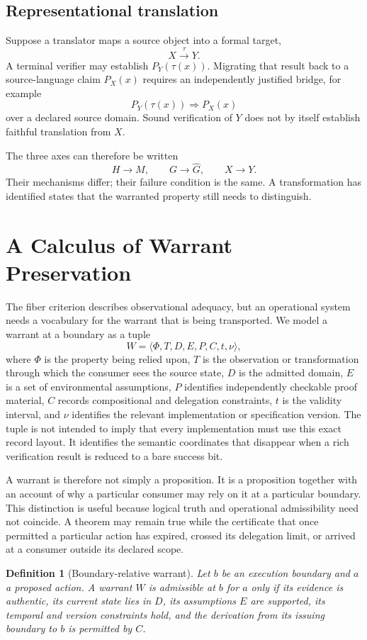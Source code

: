 \documentclass[11pt]{article}
\newtheorem{definition}{Definition}
\begin{document}
\subsection{Representational translation}
Suppose a translator maps a source object into a formal target,
\[
X\xrightarrow{\tau}Y.
\]
A terminal verifier may establish $P_Y(\tau(x))$. Migrating that result back to a source-language claim $P_X(x)$ requires an independently justified bridge, for example
\[
P_Y(\tau(x))\Longrightarrow P_X(x)
\]
over a declared source domain. Sound verification of $Y$ does not by itself establish faithful translation from $X$.

The three axes can therefore be written
\[
H\to M,\qquad G\to\widehat G,\qquad X\to Y.
\]
Their mechanisms differ; their failure condition is the same. A transformation has identified states that the warranted property still needs to distinguish.

\section{A Calculus of Warrant Preservation}
The fiber criterion describes observational adequacy, but an operational system needs a vocabulary for the warrant that is being transported. We model a warrant at a boundary as a tuple
\[
W=\langle \Phi,T,D,E,P,C,t,\nu\rangle,
\]
where $\Phi$ is the property being relied upon, $T$ is the observation or transformation through which the consumer sees the source state, $D$ is the admitted domain, $E$ is a set of environmental assumptions, $P$ identifies independently checkable proof material, $C$ records compositional and delegation constraints, $t$ is the validity interval, and $\nu$ identifies the relevant implementation or specification version. The tuple is not intended to imply that every implementation must use this exact record layout. It identifies the semantic coordinates that disappear when a rich verification result is reduced to a bare success bit.

A warrant is therefore not simply a proposition. It is a proposition together with an account of why a particular consumer may rely on it at a particular boundary. This distinction is useful because logical truth and operational admissibility need not coincide. A theorem may remain true while the certificate that once permitted a particular action has expired, crossed its delegation limit, or arrived at a consumer outside its declared scope.

\begin{definition}[Boundary-relative warrant]
Let $b$ be an execution boundary and $a$ a proposed action. A warrant $W$ is \emph{admissible at $b$ for $a$} only if its evidence is authentic, its current state lies in $D$, its assumptions $E$ are supported, its temporal and version constraints hold, and the derivation from its issuing boundary to $b$ is permitted by $C$.
\end{definition}
\end{document}
